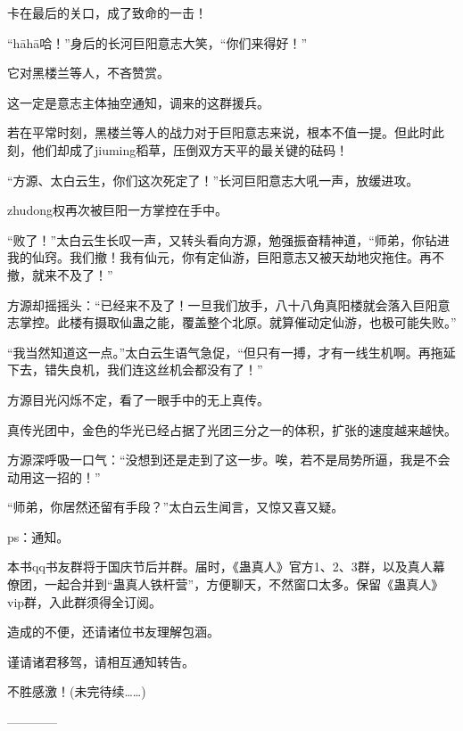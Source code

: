 \begin{this_body}
卡在最后的关口，成了致命的一击！

“hāhā哈！”身后的长河巨阳意志大笑，“你们来得好！”

它对黑楼兰等人，不吝赞赏。

这一定是意志主体抽空通知，调来的这群援兵。

若在平常时刻，黑楼兰等人的战力对于巨阳意志来说，根本不值一提。但此时此刻，他们却成了jiuming稻草，压倒双方天平的最关键的砝码！

“方源、太白云生，你们这次死定了！”长河巨阳意志大吼一声，放缓进攻。

zhudong权再次被巨阳一方掌控在手中。

“败了！”太白云生长叹一声，又转头看向方源，勉强振奋精神道，“师弟，你钻进我的仙窍。我们撤！我有仙元，你有定仙游，巨阳意志又被天劫地灾拖住。再不撤，就来不及了！”

方源却摇摇头：“已经来不及了！一旦我们放手，八十八角真阳楼就会落入巨阳意志掌控。此楼有摄取仙蛊之能，覆盖整个北原。就算催动定仙游，也极可能失败。”

“我当然知道这一点。”太白云生语气急促，“但只有一搏，才有一线生机啊。再拖延下去，错失良机，我们连这丝机会都没有了！”

方源目光闪烁不定，看了一眼手中的无上真传。

真传光团中，金色的华光已经占据了光团三分之一的体积，扩张的速度越来越快。

方源深呼吸一口气：“没想到还是走到了这一步。唉，若不是局势所逼，我是不会动用这一招的！”

“师弟，你居然还留有手段？”太白云生闻言，又惊又喜又疑。

ps：通知。

本书qq书友群将于国庆节后并群。届时，《蛊真人》官方1、2、3群，以及真人幕僚团，一起合并到“蛊真人铁杆营”，方便聊天，不然窗口太多。保留《蛊真人》vip群，入此群须得全订阅。

造成的不便，还请诸位书友理解包涵。

谨请诸君移驾，请相互通知转告。

不胜感激！(未完待续……)

------------

\end{this_body}

